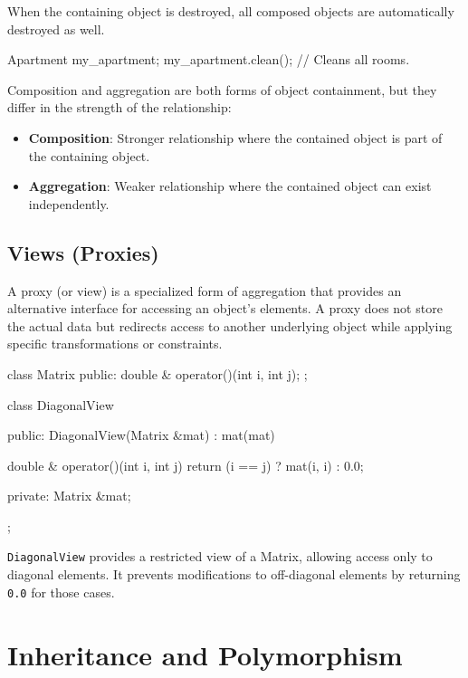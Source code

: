 \vspace{-0.5em}

When the containing object is destroyed, all composed objects are automatically destroyed as well.

\begin{codeblock}
Apartment my_apartment;
my_apartment.clean(); // Cleans all rooms.    
\end{codeblock}

\begin{observationblock}
    Composition and aggregation are both forms of object containment, but they differ in the strength of the relationship:
    \begin{itemize}
        \item \textbf{Composition}: Stronger relationship where the contained object is part of the containing object.
        \item \textbf{Aggregation}: Weaker relationship where the contained object can exist independently.
    \end{itemize}
\end{observationblock}

\subsection{Views (Proxies)}

A proxy (or view) is a specialized form of aggregation that provides an alternative interface for accessing an object's elements. A proxy does not store the actual data but redirects access to another underlying object while applying specific transformations or constraints.

\begin{codeblock}[language=C++]
class Matrix {
public:
    double & operator()(int i, int j);
};

class DiagonalView {
public:
    DiagonalView(Matrix &mat) : mat(mat) {}

    double & operator()(int i, int j) {
        return (i == j) ? mat(i, i) : 0.0; 
    }

private:
    Matrix &mat;
};
\end{codeblock}

\texttt{DiagonalView} provides a restricted view of a Matrix, allowing access only to diagonal elements. It prevents modifications to off-diagonal elements by returning \texttt{0.0} for those cases.

\newpage

\section{Inheritance and Polymorphism}

